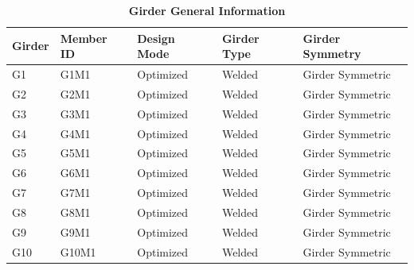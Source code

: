 \documentclass[12pt,a4paper]{report}
\numberwithin{table}{chapter}
\numberwithin{figure}{chapter}
\begin{document}
\newpage

\vspace{0.4em}
\noindent
            
\vspace{4pt}
\begin{longtable}{|L{2.2cm}|L{1.8cm}|p{3.8cm}|p{3.8cm}|p{3.8cm}|}
\caption{\textbf{Girder General Information}}
\hline
\textbf{Girder} & \textbf{Member ID} & \textbf{Design Mode} & \textbf{Girder Type} & \textbf{Girder Symmetry} \\[6pt]
\hline
G1 & G1M1 & Optimized & Welded & Girder Symmetric \\[8pt]
\hline
G2 & G2M1 & Optimized & Welded & Girder Symmetric \\[8pt]
\hline
G3 & G3M1 & Optimized & Welded & Girder Symmetric \\[8pt]
\hline
G4 & G4M1 & Optimized & Welded & Girder Symmetric \\[8pt]
\hline
G5 & G5M1 & Optimized & Welded & Girder Symmetric \\[8pt]
\hline
G6 & G6M1 & Optimized & Welded & Girder Symmetric \\[8pt]
\hline
G7 & G7M1 & Optimized & Welded & Girder Symmetric \\[8pt]
\hline
G8 & G8M1 & Optimized & Welded & Girder Symmetric \\[8pt]
\hline
G9 & G9M1 & Optimized & Welded & Girder Symmetric \\[8pt]
\hline
G10 & G10M1 & Optimized & Welded & Girder Symmetric \\[8pt]
\hline
\end{longtable}

\vspace{0.6em}
\end{document}
